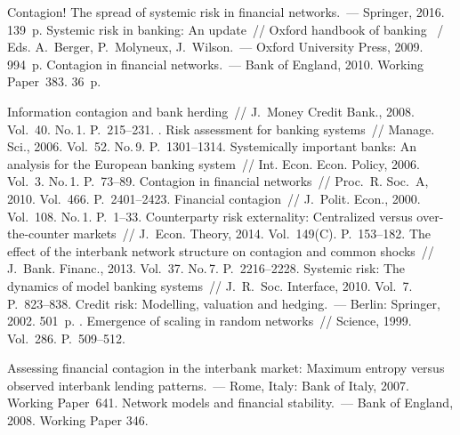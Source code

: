  \begin{multicols}{2}

\renewcommand{\bibname}{\protect\rmfamily Литература}

{\small\frenchspacing
{%
\begin{thebibliography}{99}
  Contagion! The spread of systemic risk in financial networks.~---
Springer, 2016. 139~p.
 Systemic risk in banking: An update~// Oxford handbook of banking
 ~/ Eds. A.~Berger, P.~Molyneux, J.~Wilson.~--- 
 Oxford University Press, 2009. 994~p.
Contagion in financial networks.~--- Bank of England, 2010. Working Paper~383. 36~p.

  Information contagion and bank herding~//
J.~Money Credit Bank., 2008. Vol.~40. No.\,1. P.~215--231.
.  Risk assessment for banking systems~//
Manage. Sci., 2006. Vol.~52. No.\,9. P.~1301--1314.
Systemically important banks: An analysis for the European banking system~//
Int. Econ. Econ. Policy, 2006. Vol.~3. No.\,1. P.~73--89.
 Contagion in financial networks~// Proc.~R. Soc.~A, 2010. Vol.~466. P.~2401--2423.  
 Financial contagion~//
 J.~Polit. Econ., 2000. Vol.~108. No.\,1. P.~1--33.
 Counterparty risk externality: Centralized versus
over-the-counter markets~// J.~Econ. Theory, 2014. Vol.~149(C). P.~153--182.
  The effect of the interbank network structure on contagion and 
common shocks~// J.~Bank. Financ., 2013. Vol.~37. No.\,7. P.~2216--2228.
 Systemic risk: The dynamics of model banking systems~// J.~R.~Soc. Interface,
 2010. Vol.~7. P.~823--838.
Credit risk: Modelling, valuation and hedging.~---
Berlin:  Springer, 2002. 501~p.
. Emergence of scaling in random networks~//
Science, 1999. Vol.~286. P.~509--512.

 Assessing financial contagion in the interbank market: Maximum 
entropy versus observed interbank lending patterns.~---  
Rome, Italy: Bank of Italy,  2007. Working Paper~641.
Network models and financial stability.~---  Bank of England, 2008. Working Paper 346.


\end{thebibliography}}}
\end{multicols}
